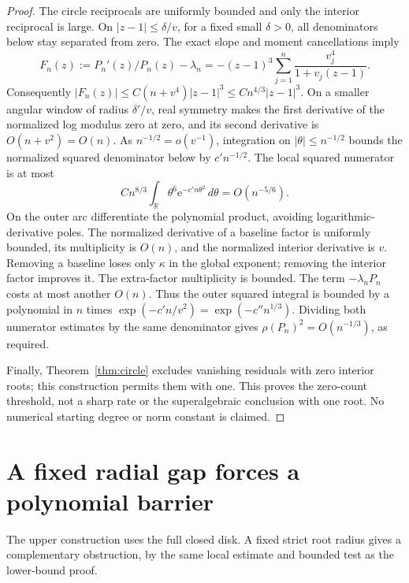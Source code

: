 \documentclass[11pt]{article}
\theoremstyle{remark}\newtheorem{remark}[theorem]{Remark}
\newcommand{\ee}{\mathrm e}
\begin{document}
\begin{proof}
The circle reciprocals are uniformly bounded and only the interior
reciprocal is large. On \(|z-1|\le\delta/v\), for a fixed small
\(\delta>0\), all denominators below stay separated from zero.
The exact slope and moment cancellations imply
\[
 F_n(z):=P_n'(z)/P_n(z)-\lambda_n
 =-(z-1)^3\sum_{j=1}^n\frac{v_j^4}{1+v_j(z-1)}.
\]
Consequently \(|F_n(z)|\le C(n+v^4)|z-1|^3
\le Cn^{4/3}|z-1|^3\). On a smaller angular window of radius
\(\delta'/v\), real symmetry makes the first derivative of the
normalized log modulus zero at zero, and its second derivative is
\(O(n+v^2)=O(n)\). As \(n^{-1/2}=o(v^{-1})\), integration
on \(|\theta|\le n^{-1/2}\) bounds the normalized squared
denominator below by \(c'n^{-1/2}\). The local squared numerator
is at most
\[
 Cn^{8/3}\int_{\mathbb R}\theta^6\ee^{-c'n\theta^2}\,d\theta
 =O(n^{-5/6}).
\]
On the outer arc differentiate the polynomial product, avoiding
logarithmic-derivative poles. The normalized derivative of a baseline
factor is uniformly bounded, its multiplicity is \(O(n)\), and
the normalized interior derivative is \(v\). Removing a baseline
loses only \(\kappa\) in the global exponent; removing the interior
factor improves it. The extra-factor multiplicity is bounded.
The term \(-\lambda_nP_n\) costs at most another \(O(n)\).
Thus the outer squared integral is bounded by a polynomial in
\(n\) times \(\exp(-c'n/v^2)=\exp(-c''n^{1/3})\).
Dividing both numerator estimates by the same denominator gives
\(\rho(P_n)^2=O(n^{-1/3})\), as required.

Finally, Theorem~\ref{thm:circle} excludes vanishing residuals with
zero interior roots; this construction permits them with one.
This proves the zero-count threshold, not a sharp rate or the
superalgebraic conclusion with one root. No numerical starting
degree or norm constant is claimed.
\end{proof}


\section{A fixed radial gap forces a polynomial barrier}\label{sec:radial}
The upper construction uses the full closed disk. A fixed strict
root radius gives a complementary obstruction, by the same local
estimate and bounded test as the lower-bound proof.
\end{document}
